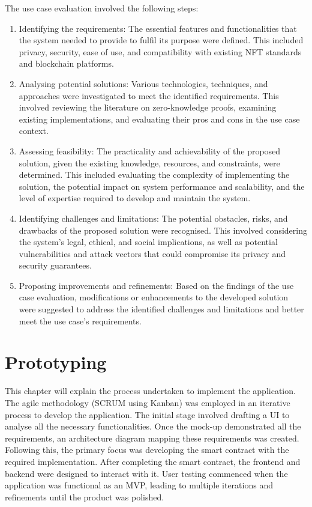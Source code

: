 The use case evaluation involved the following steps:
\begin{enumerate}
    \item Identifying the requirements: The essential features and functionalities that the system needed to provide to fulfil its purpose were defined. This included privacy, security, ease of use, and compatibility with existing \ac{NFT} standards and blockchain platforms.
    \item Analysing potential solutions: Various technologies, techniques, and approaches were investigated to meet the identified requirements. This involved reviewing the literature on zero-knowledge proofs, examining existing implementations, and evaluating their pros and cons in the use case context.
    \item Assessing feasibility: The practicality and achievability of the proposed solution, given the existing knowledge, resources, and constraints, were determined. This included evaluating the complexity of implementing the solution, the potential impact on system performance and scalability, and the level of expertise required to develop and maintain the system.
    \item Identifying challenges and limitations: The potential obstacles, risks, and drawbacks of the proposed solution were recognised. This involved considering the system's legal, ethical, and social implications, as well as potential vulnerabilities and attack vectors that could compromise its privacy and security guarantees.
    \item Proposing improvements and refinements: Based on the findings of the use case evaluation, modifications or enhancements to the developed solution were suggested to address the identified challenges and limitations and better meet the use case's requirements.
\end{enumerate}

\section{Prototyping}
This chapter will explain the process undertaken to implement the application. The agile methodology (SCRUM using Kanban) was employed in an iterative process to develop the application. The initial stage involved drafting a UI to analyse all the necessary functionalities. Once the mock-up demonstrated all the requirements, an architecture diagram mapping these requirements was created. Following this, the primary focus was developing the smart contract with the required implementation. After completing the smart contract, the frontend and backend were designed to interact with it. User testing commenced when the application was functional as an MVP, leading to multiple iterations and refinements until the product was polished.

